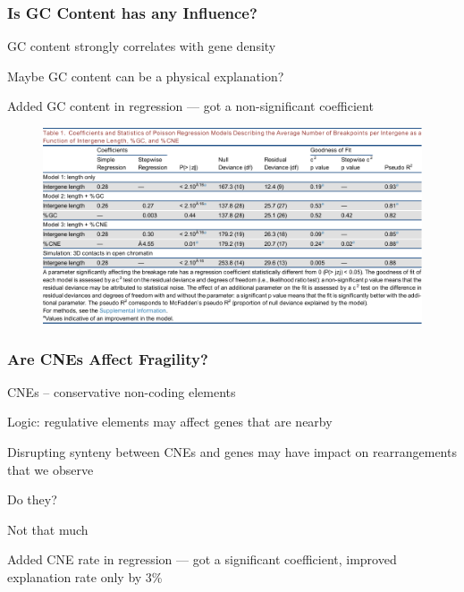 \documentclass[svgnames,14pt]{beamer}
\begin{document}
\begin{frame}
\frametitle{Is GC Content has any Influence?}
GC content strongly correlates with gene density
\vspace{12pt}

Maybe GC content can be a physical explanation?
\pause

\vspace{12pt}
Added GC content in regression --- got a non-significant coefficient
\end{frame}

\begin{frame}
\begin{figure}
	\centering
	\includegraphics[scale = .67]{Table11.pdf}
\end{figure}
\end{frame}

\begin{frame}
\frametitle{Are CNEs Affect Fragility?}
CNEs -- conservative non-coding elements
\vspace{12pt}

Logic: regulative elements may affect genes that are nearby

\vspace{12pt}
Disrupting synteny between CNEs and genes may have impact on rearrangements that we observe

\vspace{12pt}
Do they?
\vspace{12pt}

\pause
Not that much
\vspace{12pt}

Added CNE rate in regression --- got a significant coefficient, improved explanation rate only by 3\%
\end{frame}
\end{document}
